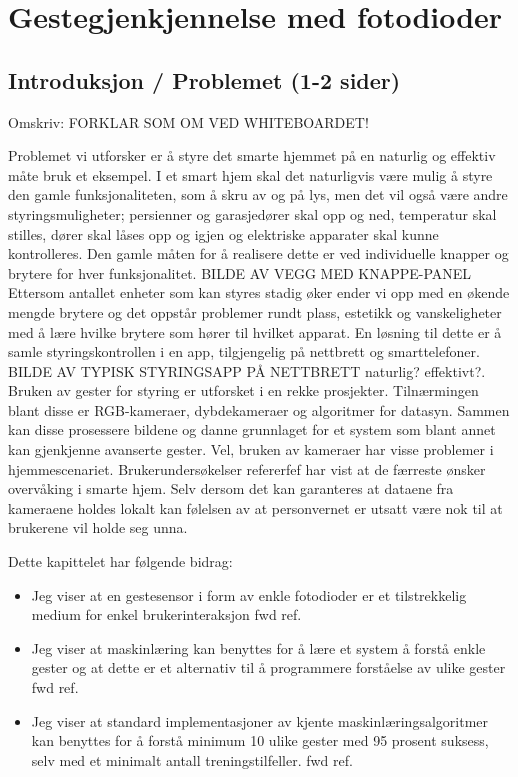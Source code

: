 \section{Gestegjenkjennelse med fotodioder}
\subsection{Introduksjon / Problemet (1-2 sider)}
{\color{red} Omskriv: FORKLAR SOM OM VED WHITEBOARDET!}

Problemet vi utforsker er å styre det smarte hjemmet på en naturlig og effektiv måte {\color{red} bruk et eksempel}. I et smart hjem skal det naturligvis være mulig å styre den gamle funksjonaliteten, som å skru av og på lys, men det vil også være andre styringsmuligheter; persienner og garasjedører skal opp og ned, temperatur skal stilles, dører skal låses opp og igjen og elektriske apparater skal kunne kontrolleres. Den gamle måten for å realisere dette er ved individuelle knapper og brytere for hver funksjonalitet.  {\color{red} BILDE AV VEGG MED KNAPPE-PANEL} Ettersom antallet enheter som kan styres stadig øker ender vi opp med en økende mengde brytere og det oppstår problemer rundt plass, estetikk og vanskeligheter med å lære hvilke brytere som hører til hvilket apparat. En løsning til dette er å samle styringskontrollen i en app, tilgjengelig på nettbrett og smarttelefoner. {\color{red} BILDE AV TYPISK STYRINGSAPP PÅ NETTBRETT} {\color{red} naturlig? effektivt?}. Bruken av gester for styring er utforsket i en rekke prosjekter. Tilnærmingen blant disse er RGB-kameraer, dybdekameraer og algoritmer for datasyn. Sammen kan disse prosessere bildene og danne grunnlaget for et system som blant annet kan gjenkjenne avanserte gester. Vel, bruken av kameraer har visse problemer i hjemmescenariet. Brukerundersøkelser {\color{red} refererfef} har vist at de færreste ønsker overvåking i smarte hjem. Selv dersom det kan garanteres at dataene fra kameraene holdes lokalt kan følelsen av at personvernet er utsatt være nok til at brukerene vil holde seg unna.

Dette kapittelet har følgende bidrag:
\begin{itemize}
\item Jeg viser at en gestesensor i form av enkle fotodioder er et tilstrekkelig medium for enkel brukerinteraksjon {\color{red} fwd ref}.
\item Jeg viser at maskinlæring kan benyttes for å lære et system å forstå enkle gester og at dette er et  alternativ til å programmere forståelse av ulike gester {\color{red} fwd ref}.
\item Jeg viser at standard implementasjoner av kjente maskinlæringsalgoritmer kan benyttes for å forstå minimum 10 ulike gester med 95 prosent suksess, selv med et minimalt antall treningstilfeller. {\color{red} fwd ref}.
\end{itemize}

